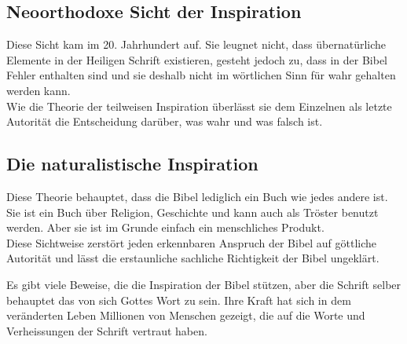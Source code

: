 \subsection{Neoorthodoxe Sicht der Inspiration}
Diese Sicht kam im 20. Jahrhundert auf. Sie leugnet nicht, dass übernatürliche Elemente in der Heiligen Schrift existieren, gesteht jedoch zu, dass in der Bibel Fehler enthalten sind und sie deshalb nicht im wörtlichen Sinn für wahr gehalten werden kann.\\
Wie die Theorie der teilweisen Inspiration überlässt sie dem Einzelnen als letzte Autorität die Entscheidung darüber, was wahr und was falsch ist.
\subsection{Die naturalistische Inspiration}
Diese Theorie behauptet, dass die Bibel lediglich ein Buch wie jedes andere ist. Sie ist ein Buch über Religion, Geschichte und kann auch als Tröster benutzt werden. Aber sie ist im Grunde einfach ein menschliches Produkt.\\
Diese Sichtweise zerstört jeden erkennbaren Anspruch der Bibel auf göttliche Autorität und lässt die erstaunliche sachliche Richtigkeit der Bibel ungeklärt.

\begin{otsblock}[Fazit]
    Es gibt viele Beweise, die die Inspiration der Bibel stützen, aber die Schrift selber behauptet das von sich Gottes Wort zu sein. Ihre Kraft hat sich in dem veränderten Leben Millionen von Menschen gezeigt, die auf die Worte und Verheissungen der Schrift vertraut haben.    
\end{otsblock}